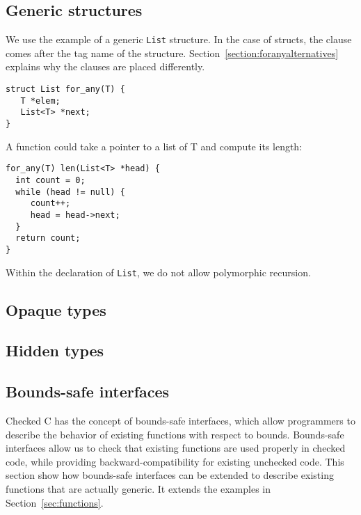 \subsection{Generic structures}
We use the example of a generic \lstinline+List+ structure.   In the case of structs,
the \forany{} clause comes after the tag name of the structure.  
Section~\ref{section:foranyalternatives} explains why the \forany{} clauses 
are placed differently.
\begin{lstlisting}
struct List for_any(T) { 
   T *elem;
   List<T> *next;
}
\end{lstlisting}
A function could take a pointer to a list of T and compute its length:
\begin{lstlisting}
for_any(T) len(List<T> *head) {
  int count = 0;
  while (head != null) {
     count++;
     head = head->next;
  }
  return count;
}
\end{lstlisting}
Within the declaration of \lstinline+List+, we do not allow polymorphic recursion.

\subsection{Opaque types}

\subsection{Hidden types}

\subsection{Bounds-safe interfaces}
\label{sec:bounds-safe-interfaces}
Checked C has the concept of bounds-safe interfaces, which allow programmers
to describe the behavior of existing functions with respect to bounds.  Bounds-safe
interfaces allow us to check that existing functions are used properly in 
checked code, while providing backward-compatibility for existing unchecked code.
This section show how bounds-safe interfaces can be extended to describe
existing functions that are actually generic.  It extends the examples
in Section~\ref{sec:functions}.

